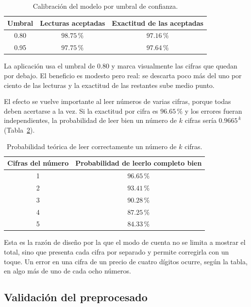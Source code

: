 \documentclass[12pt,letterpaper]{article}
\newcommand{\pc}{\,\%}
\begin{document}
\begin{table}[htbp]
\centering
\caption{Calibración del modelo por umbral de confianza.}
\label{tab:calibracion}
\begin{tabular}{ccc}
\toprule
\textbf{Umbral} & \textbf{Lecturas aceptadas} & \textbf{Exactitud de las aceptadas} \\
\midrule
0.80 & $98.75\pc$ & $97.16\pc$ \\
0.95 & $97.75\pc$ & $97.64\pc$ \\
\bottomrule
\end{tabular}
\end{table}

La aplicación usa el umbral de $0.80$ y marca visualmente las cifras que quedan por
debajo. El beneficio es modesto pero real: se descarta poco más del uno por ciento
de las lecturas y la exactitud de las restantes sube medio punto.

El efecto se vuelve importante al leer números de varias cifras, porque todas deben
acertarse a la vez. Si la exactitud por cifra es $96.65\pc$ y los errores fueran
independientes, la probabilidad de leer bien un número de $k$ cifras sería
$0.9665^{\,k}$ (Tabla~\ref{tab:kcifras}).

\begin{table}[htbp]
\centering
\caption{Probabilidad teórica de leer correctamente un número de $k$ cifras.}
\label{tab:kcifras}
\begin{tabular}{cc}
\toprule
\textbf{Cifras del número} & \textbf{Probabilidad de leerlo completo bien} \\
\midrule
1 & $96.65\pc$ \\
2 & $93.41\pc$ \\
3 & $90.28\pc$ \\
4 & $87.25\pc$ \\
5 & $84.33\pc$ \\
\bottomrule
\end{tabular}
\end{table}

Esta es la razón de diseño por la que el modo de cuenta no se limita a mostrar el
total, sino que presenta cada cifra por separado y permite corregirla con un toque.
Un error en una cifra de un precio de cuatro dígitos ocurre, según la tabla, en algo
más de uno de cada ocho números.

\subsection{Validación del preprocesado}
\end{document}
